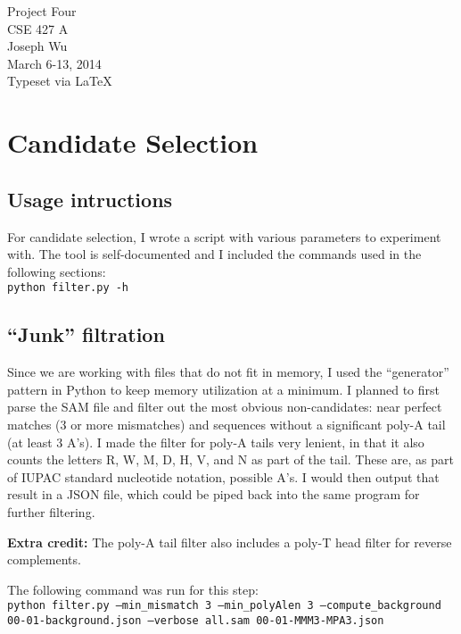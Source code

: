 \documentclass[a4paper, 12pt]{report}
\begin{document}
    \begin{center}
        {\LARGE Project Four} \\
        CSE 427 A \\
        Joseph Wu  \\
        March 6-13, 2014 \\
        {\tiny Typeset via \LaTeX}
    \end{center}
    
\section{Candidate Selection}
    \subsection{Usage intructions}
    For candidate selection, I wrote a script with various parameters to experiment with.  
    The tool is self-documented and I included the commands used in the following sections: \\
    \texttt{python filter.py -h}
    
    
    \subsection{``Junk'' filtration}
        Since we are working with files that do not fit in memory, 
            I used the ``generator'' pattern in Python to keep memory utilization at a minimum.
        I planned to first parse the SAM file and filter out the most obvious non-candidates:
            near perfect matches (3 or more mismatches) 
            and sequences without a significant poly-A tail (at least 3 A's). 
        I made the filter for poly-A tails very lenient, 
            in that it also counts the letters R, W, M, D, H, V, and N
            as part of the tail.  
        These are, as part of IUPAC standard nucleotide notation, possible A's.
        I would then output that result in a JSON file, 
            which could be piped back into the same program for further filtering.
            
        \textbf{Extra credit:} The poly-A tail filter also includes a poly-T head filter for reverse complements.
            
        The following command was run for this step: \\
        \texttt{python filter.py --min\_mismatch 3 --min\_polyAlen 3 --compute\_background \\
                00-01-background.json --verbose all.sam 00-01-MMM3-MPA3.json}
        
\end{document}
